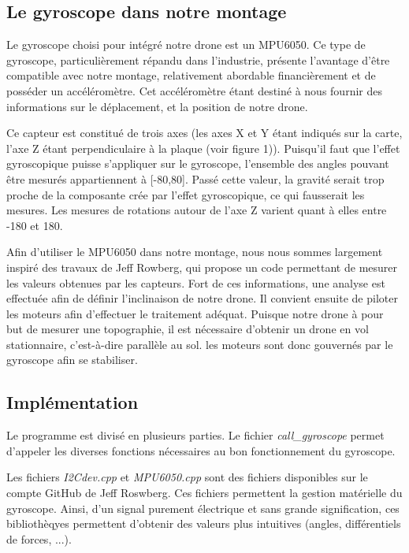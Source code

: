 \documentclass[a4paper,10pt]{report}
\begin{document}
	\subsection{Le gyroscope dans notre montage}
	  Le gyroscope choisi pour intégré notre drone est un MPU6050. Ce type 
de gyroscope, particulièrement répandu dans l'industrie, présente l'avantage 
d'être compatible avec notre montage, relativement abordable financièrement et 
de posséder un accéléromètre. Cet accéléromètre étant destiné à nous fournir 
des informations sur le déplacement, et la position de notre drone. 
 
	  Ce capteur est constitué de trois axes (les axes X et Y étant 
indiqués sur la carte, l'axe Z étant perpendiculaire à la plaque (voir figure 
1)). Puisqu'il faut que l'effet gyroscopique puisse s'appliquer sur le 
gyroscope, l'ensemble des angles pouvant être mesurés appartiennent à [-80,80]. 
Passé cette valeur, la gravité serait trop proche de la composante crée par 
l'effet gyroscopique, ce qui fausserait les mesures. Les mesures de rotations 
autour de l'axe Z varient quant à elles entre -180 et 180.

	  Afin d'utiliser le MPU6050 dans notre montage, nous nous sommes 
largement inspiré des travaux de Jeff Rowberg\cite{jeffrwork}, qui propose un 
code permettant de mesurer les valeurs obtenues par les capteurs. Fort de ces 
informations, une analyse est effectuée afin de définir l'inclinaison de notre 
drone. Il convient ensuite de piloter les moteurs afin d'effectuer le 
traitement adéquat. Puisque notre drone à pour but de mesurer une topographie, 
il est nécessaire d'obtenir un drone en vol stationnaire, c'est-à-dire 
parallèle au sol. les moteurs sont donc gouvernés par le gyroscope afin se 
stabiliser.
  
	\subsection{Implémentation}
	  Le programme est divisé en plusieurs parties. Le fichier 
\textit{call\_gyroscope} permet d'appeler les diverses fonctions nécessaires au 
bon fonctionnement du gyroscope. 

	  Les fichiers \textit{I2Cdev.cpp} et \textit{MPU6050.cpp} sont des 
fichiers disponibles sur le compte GitHub de Jeff 
Roswberg\cite{jeff_rowberg_lib}. Ces fichiers permettent la gestion matérielle 
du gyroscope. Ainsi, d'un signal purement électrique et sans grande 
signification, ces bibliothèqyes permettent d'obtenir des valeurs plus 
intuitives (angles, différentiels de forces, ...).
\end{document}
